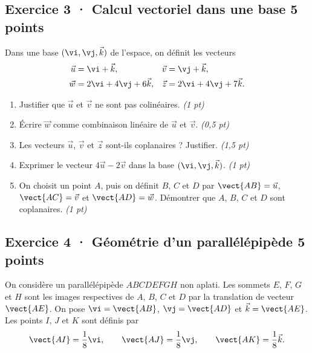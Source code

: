 \clearpage{}\par

\subsection*{Exercice 3 · Calcul vectoriel dans une base \hfill 5 points}Dans une base $(\vi,\vj,\vec k)$ de l'espace, on définit les vecteurs
\[\begin{aligned}\vec u&=\vi+\vec k,&\vec v&=\vj+\vec k,\\
\vec w&=2\vi+4\vj+6\vec k,&\vec z&=2\vi+4\vj+7\vec k.\end{aligned}\]

\begin{enumerate}

\item Justifier que $\vec u$ et $\vec v$ ne sont pas colinéaires. \hfill\textit{(1 pt)}

\item Écrire $\vec w$ comme combinaison linéaire de $\vec u$ et $\vec v$. \hfill\textit{(0,5 pt)}

\item Les vecteurs $\vec u$, $\vec v$ et $\vec z$ sont-ils coplanaires ? Justifier. \hfill\textit{(1,5 pt)}

\item Exprimer le vecteur $4\vec u-2\vec v$ dans la base $(\vi,\vj,\vec k)$. \hfill\textit{(1 pt)}

\item On choisit un point $A$, puis on définit $B$, $C$ et $D$ par $\vect{AB}=\vec u$, $\vect{AC}=\vec v$ et $\vect{AD}=\vec w$. Démontrer que $A$, $B$, $C$ et $D$ sont coplanaires. \hfill\textit{(1 pt)}

\end{enumerate}

\subsection*{Exercice 4 · Géométrie d'un parallélépipède \hfill 5 points}On considère un parallélépipède $ABCDEFGH$ non aplati. Les sommets $E$, $F$, $G$ et $H$ sont les images respectives de $A$, $B$, $C$ et $D$ par la translation de vecteur $\vect{AE}$.
On pose $\vi=\vect{AB}$, $\vj=\vect{AD}$ et $\vec k=\vect{AE}$.
Les points $I$, $J$ et $K$ sont définis par
\[\vect{AI}=\frac1{8}\vi,\qquad\vect{AJ}=\frac1{8}\vj,\qquad\vect{AK}=\frac1{8}\vec k.\]

